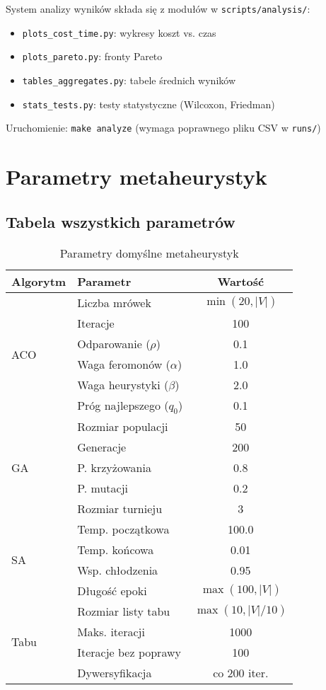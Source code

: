 System analizy wyników składa się z modułów w \texttt{scripts/analysis/}:

\begin{itemize}
\item \texttt{plots\_cost\_time.py}: wykresy koszt vs. czas
\item \texttt{plots\_pareto.py}: fronty Pareto
\item \texttt{tables\_aggregates.py}: tabele średnich wyników
\item \texttt{stats\_tests.py}: testy statystyczne (Wilcoxon, Friedman)
\end{itemize}

Uruchomienie: \texttt{make analyze} (wymaga poprawnego pliku CSV w \texttt{runs/})

\section{Parametry metaheurystyk}

\subsection{Tabela wszystkich parametrów}

\begin{table}[h!]
\centering
\caption{Parametry domyślne metaheurystyk}
\begin{tabular}{|l|l|c|}
\hline
\textbf{Algorytm} & \textbf{Parametr} & \textbf{Wartość} \\
\hline
\multirow{6}{*}{ACO} & Liczba mrówek & $\min(20, |V|)$ \\
& Iteracje & 100 \\
& Odparowanie ($\rho$) & 0.1 \\
& Waga feromonów ($\alpha$) & 1.0 \\
& Waga heurystyki ($\beta$) & 2.0 \\
& Próg najlepszego ($q_0$) & 0.1 \\
\hline
\multirow{5}{*}{GA} & Rozmiar populacji & 50 \\
& Generacje & 200 \\
& P. krzyżowania & 0.8 \\
& P. mutacji & 0.2 \\
& Rozmiar turnieju & 3 \\
\hline
\multirow{4}{*}{SA} & Temp. początkowa & 100.0 \\
& Temp. końcowa & 0.01 \\
& Wsp. chłodzenia & 0.95 \\
& Długość epoki & $\max(100, |V|)$ \\
\hline
\multirow{4}{*}{Tabu} & Rozmiar listy tabu & $\max(10, |V|/10)$ \\
& Maks. iteracji & 1000 \\
& Iteracje bez poprawy & 100 \\
& Dywersyfikacja & co 200 iter. \\
\hline
\end{tabular}
\end{table}

